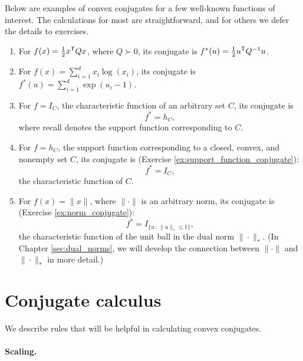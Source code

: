 \begin{Example}
Below are examples of convex conjugates for a few well-known functions of
interest. The calculations for most are straightforward, and for others we defer
the details to exercises. 

\begin{enumerate}[label=\alph*., ref=\alph*]
\item For $f(x) = \frac{1}{2} x^{\mathsf{T}} Q x$, where $Q \succ 0$, its conjugate is
  $f^*(u) = \frac{1}{2} u^{\mathsf{T}} Q^{-1} u$.

\item For $f(x) = \sum_{i=1}^d x_i \log(x_i)$, its conjugate is $f^*(u) =
  \sum_{i=1}^d \exp(u_i - 1)$. 

\item {}   
  For $f = I_C$, the characteristic function of an arbitrary set $C$, its
  conjugate is  
  \[
  f^* = h_C,
  \]
  where recall  denotes the support
  function corresponding to $C$.  

\item {} 
  For $f = h_C$, the support function corresponding to a closed, convex, and
  nonempty set $C$, its conjugate is (Exercise
  \ref{ex:support_function_conjugate}):    
  \[
  f^* = I_C,
  \]
  the characteristic function of $C$. 

\item {}  
  For $f(x) = \|x\|$, where $\|\cdot\|$ is an arbitrary norm, its conjugate is
  (Exercise \ref{ex:norm_conjugate}):  
  \[
  f^* = I_{\{u \,:\, \|u\|_* \leq 1\}},
  \]
  the characteristic function of the unit ball in the dual norm
  $\|\cdot\|_*$. (In Chapter \ref{sec:dual_norms}, we will develop the
  connection between $\|\cdot\|$ and $\|\cdot\|_*$ in more detail.)  
\end{enumerate}
\end{Example}

\section{Conjugate calculus}

We describe rules that will be helpful in calculating convex conjugates.  

\paragraph{Scaling.}


